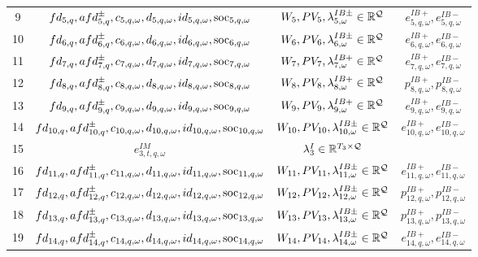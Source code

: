 \begin{table}[H]
\begin{tabular}{c c c c}
	9& $fd_{5,q}, afd^{\pm}_{5,q}, c_{5,q, \omega}, d_{5,q, \omega}, id_{5,q, \omega}, \text{soc}_{5,q, \omega}$ & $W_5, PV_5, \lambda^{IB\pm}_{5, \omega} \in \mathbb{R}^\mathcal{Q}$ & $e^{IB+}_{5,q, \omega}, e^{IB-}_{5,q, \omega}$\\
	10& $fd_{6,q}, afd^{\pm}_{6,q}, c_{6, q,\omega}, d_{6, q,\omega}, id_{6, q,\omega}, \text{soc}_{6,q, \omega}$& $W_6, PV_6, \lambda^{IB\pm}_{6, \omega} \in \mathbb{R}^\mathcal{Q}$& $e^{IB+}_{6,q, \omega}, e^{IB-}_{6, q,\omega}$\\
	11& $fd_{7,q}, afd^{\pm}_{7,q}, c_{7, q,\omega}, d_{7, q,\omega}, id_{7, q,\omega}, \text{soc}_{7,q, \omega}$& $W_7, PV_7, \lambda^{IB+}_{7, \omega} \in \mathbb{R}^\mathcal{Q}$& $e^{IB+}_{7,q, \omega}, e^{IB-}_{7,q, \omega}$\\
	12& $fd_{8,q}, afd^{\pm}_{8,q}, c_{8,q, \omega}, d_{8,q, \omega}, id_{8,q, \omega}, \text{soc}_{8,q, \omega}$ & $W_8, PV_8, \lambda^{IB+}_{8, \omega} \in \mathbb{R}^\mathcal{Q}$ & $p^{IB+}_{8,q, \omega}, p^{IB-}_{8,q, \omega}$ \\
	13& $fd_{9,q}, afd^{\pm}_{9,q}, c_{9,q, \omega}, d_{9,q, \omega}, id_{9,q, \omega}, \text{soc}_{9,q, \omega}$ & $W_9, PV_9, \lambda^{IB+}_{9, \omega} \in \mathbb{R}^\mathcal{Q}$ & $e^{IB+}_{9,q, \omega}, e^{IB-}_{9,q, \omega}$\\
	14& $fd_{10,q}, afd^{\pm}_{10,q}, c_{10,q, \omega}, d_{10,q, \omega}, id_{10,q, \omega}, \text{soc}_{10,q, \omega}$ & $W_{10}, PV_{10}, \lambda^{IB\pm}_{10, \omega} \in \mathbb{R}^\mathcal{Q}$ & $e^{IB+}_{10,q, \omega}, e^{IB-}_{10,q, \omega}$\\
 15& $e^{IM}_{3, t, q, \omega}$ & $\lambda^I_3 \in \mathbb{R}^{T_3 \times \mathcal{Q}}$&\\
	16& $fd_{11,q}, afd^{\pm}_{11,q}, c_{11,q, \omega}, d_{11,q, \omega}, id_{11,q, \omega}, \text{soc}_{11,q, \omega}$ & $W_{11}, PV_{11}, \lambda^{IB\pm}_{11, \omega} \in \mathbb{R}^\mathcal{Q}$ & $e^{IB+}_{11,q, \omega}, e^{IB-}_{11,q, \omega}$\\
	17& $fd_{12,q}, afd^{\pm}_{12,q}, c_{12,q, \omega}, d_{12,q, \omega}, id_{12,q, \omega}, \text{soc}_{12,q, \omega}$ & $W_{12}, PV_{12}, \lambda^{IB\pm}_{12, \omega} \in \mathbb{R}^\mathcal{Q}$ & $p^{IB+}_{12,q, \omega}, p^{IB-}_{12,q, \omega}$ \\
	18& $fd_{13,q}, afd^{\pm}_{13,q}, c_{13,q, \omega}, d_{13,q, \omega}, id_{13,q, \omega}, \text{soc}_{13,q, \omega}$ & $W_{13}, PV_{13}, \lambda^{IB\pm}_{13, \omega} \in \mathbb{R}^\mathcal{Q}$ & $p^{IB+}_{13,q, \omega}, p^{IB-}_{13,q, \omega}$ \\
	19& $fd_{14,q}, afd^{\pm}_{14,q}, c_{14,q, \omega}, d_{14,q, \omega}, id_{14,q, \omega}, \text{soc}_{14,q, \omega}$ & $W_{14}, PV_{14}, \lambda^{IB\pm}_{14, \omega} \in \mathbb{R}^\mathcal{Q}$ & $e^{IB+}_{14,q, \omega}, e^{IB-}_{14,q, \omega}$\\

\end{tabular}
\end{table}
